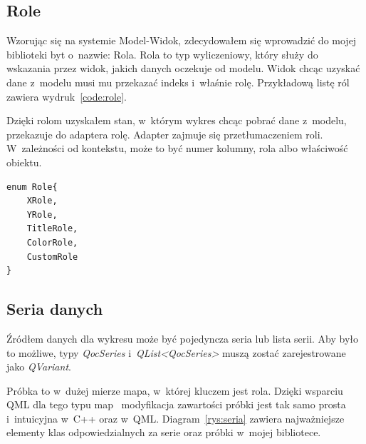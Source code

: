 \subsection{Role}
Wzorując się na systemie Model-Widok, zdecydowałem się wprowadzić do mojej biblioteki byt o~nazwie: Rola. Rola to typ wyliczeniowy, który służy do wskazania przez widok, jakich danych oczekuje od modelu. Widok chcąc uzyskać dane z~modelu musi mu przekazać indeks i~właśnie rolę. Przykładową listę ról zawiera wydruk~\ref{code:role}.

Dzięki rolom uzyskałem stan, w~którym wykres chcąc pobrać dane z~modelu, przekazuje do adaptera rolę. Adapter zajmuje się przetłumaczeniem roli. W~zależności od kontekstu, może to być numer kolumny, rola  albo właściwość obiektu.

\begin{lstlisting}[caption=Rola -- typ wyliczeniowy, label=code:role]
enum Role{
	XRole,
	YRole,
	TitleRole,
	ColorRole,
	CustomRole
}
\end{lstlisting}



\subsection{Seria danych}
Źródłem danych dla wykresu może być pojedyncza seria lub lista serii. Aby było to możliwe, typy \textit{QocSeries} i~\textit{QList<QocSeries>} muszą zostać zarejestrowane jako \textit{QVariant}.

Próbka to w~dużej mierze mapa, w~której kluczem jest rola. Dzięki wsparciu QML dla tego typu map~\cite{QML:Variant} modyfikacja zawartości próbki jest tak samo prosta i~intuicyjna w~C++ oraz w~QML. Diagram~\ref{rys:seria} zawiera najważniejsze elementy klas odpowiedzialnych za serie oraz próbki w~mojej bibliotece.

